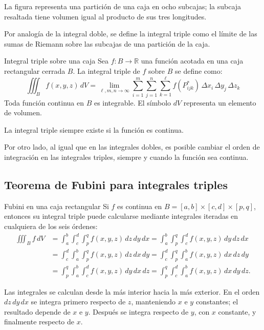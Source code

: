La figura representa una partición de una caja en ocho subcajas; la subcaja resaltada tiene volumen igual al producto de sus tres longitudes.

Por analogía de la integral doble, se define la integral triple como el límite de las sumas de Riemann sobre las subcajas de una partición de la caja.

\begin{mydefinition}{Integral triple sobre una caja}
Sea $f:B\to\mathbb{R}$ una función acotada en una caja rectangular cerrada $B$. La integral triple de $f$ sobre $B$ se define como:
\[
\iiint_B f(x,y,z)\,dV
=\lim_{\ell, m, n \to \infty}
\sum_{i=1}^{m}\sum_{j=1}^{n}\sum_{k=1}^{\ell}
f(P_{ijk}^*)\,\Delta x_i\,\Delta y_j\,\Delta z_k
\]
Toda función continua en $B$ es integrable. El símbolo $dV$ representa un elemento de volumen.
\end{mydefinition}

La integral triple siempre existe si la función es continua.

Por otro lado, al igual que en las integrales dobles, es posible cambiar el orden de integración en las integrales triples, siempre y cuando la función sea continua.

\subsection{Teorema de Fubini para integrales triples}

\begin{mytheorem}{Fubini en una caja rectangular}
Si $f$ es continua en $B=[a,b]\times[c,d]\times[p,q]$, entonces su integral triple puede calcularse mediante integrales iteradas en cualquiera de los seis órdenes:
\begin{align*}
\iiint_B f\,dV
&=\int_a^b\int_c^d\int_p^q f(x,y,z)\,dz\,dy\,dx
=\int_a^b\int_p^q\int_c^d f(x,y,z)\,dy\,dz\,dx\\
&=\int_c^d\int_a^b\int_p^q f(x,y,z)\,dz\,dx\,dy
=\int_c^d\int_p^q\int_a^b f(x,y,z)\,dx\,dz\,dy\\
&=\int_p^q\int_a^b\int_c^d f(x,y,z)\,dy\,dx\,dz
=\int_p^q\int_c^d\int_a^b f(x,y,z)\,dx\,dy\,dz.
\end{align*}
\end{mytheorem}

Las integrales se calculan desde la más interior hacia la más exterior. En el orden $dz\,dy\,dx$ se integra primero respecto de $z$, manteniendo $x$ e $y$ constantes; el resultado depende de $x$ e $y$. Después se integra respecto de $y$, con $x$ constante, y finalmente respecto de $x$.

